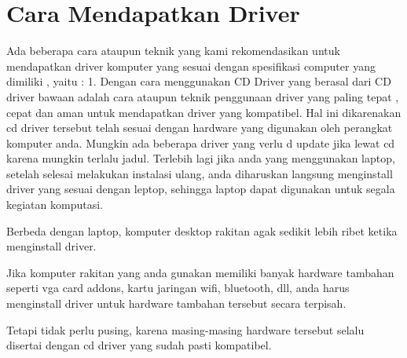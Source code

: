 \section {Cara Mendapatkan Driver}
Ada beberapa cara ataupun teknik yang kami rekomendasikan untuk mendapatkan driver komputer yang sesuai dengan spesifikasi computer yang dimiliki , yaitu :
1.	Dengan cara menggunakan CD 
Driver yang berasal dari CD driver bawaan adalah cara ataupun teknik penggunaan driver yang paling tepat , cepat dan aman untuk mendapatkan driver yang kompatibel.
Hal ini dikarenakan cd driver tersebut telah sesuai dengan hardware yang digunakan oleh perangkat komputer anda. 
Mungkin ada beberapa driver yang verlu d update jika lewat cd karena mungkin terlalu jadul.
Terlebih lagi jika anda yang menggunakan laptop, setelah selesai melakukan instalasi ulang, anda diharuskan langsung menginstall driver yang sesuai dengan leptop, sehingga laptop dapat digunakan untuk segala kegiatan komputasi.

Berbeda dengan laptop, komputer desktop rakitan agak sedikit lebih ribet ketika menginstall driver.

Jika komputer rakitan yang anda gunakan memiliki banyak hardware tambahan seperti vga card addons, kartu jaringan wifi, bluetooth, dll, anda harus menginstall driver untuk hardware tambahan tersebut secara terpisah.

Tetapi tidak perlu pusing, karena masing-masing hardware tersebut selalu disertai dengan cd driver yang sudah pasti kompatibel.

